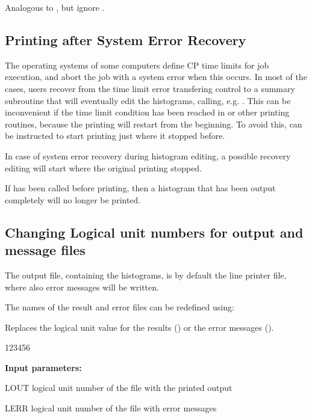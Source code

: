  
\Action
Analogous to
, but ignore .
 
\subsection{Printing after System Error Recovery}
\label{HERRECOV}

The operating systems of some computers define CP time limits
for job execution,
and abort the job with a system error when this occurs.
In most of the cases, users recover from the time limit error transfering
control to a summary subroutine that will eventually edit the histograms,
calling, e.g. .
This can be inconvenient if the time limit condition
has been reached in  or other printing routines,
because the printing will restart from the beginning.
To avoid this,  can be instructed to
start printing just where it stopped before.
 
 
\Action
In case of system error recovery during histogram editing, a possible
recovery editing will start where the original printing stopped.
 
\Remark
 
If  has been called before printing, then a histogram
that has been output completely will no longer be printed.


\subsection{Changing Logical unit numbers for output and message files}
\label{HCUNILOG} 

The output file, containing the histograms, is by default the line
printer file, where also error messages will be written.
 
The names of the result and error files can be redefined using:
 
 
\Action
Replaces the logical unit value for the results () or the
error messages ().
 
\begin{DLttc}{123456}
\item[{\rm\bf Input parameters:}]
\item[LOUT] logical unit number of the file with the printed output
\item[LERR] logical unit number of the file with error messages
\end{DLttc}
 
